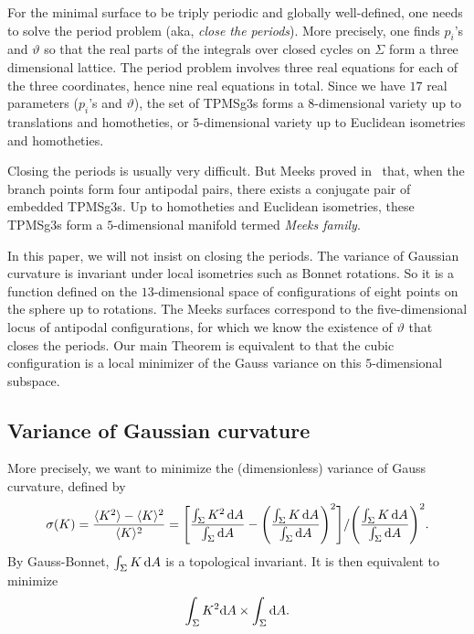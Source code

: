 \documentclass[a4paper]{amsart}
\newcommand{\dd}{{\rm d}}
\theoremstyle{plain} %
\theoremstyle{definition} %
\theoremstyle{remark}
\begin{document}
For the minimal surface to be triply periodic and globally well-defined, one
needs to solve the period problem (aka, \emph{close the periods}).  More
precisely, one finds $p_i$'s and $\vartheta$ so that the real parts of the
integrals over closed cycles on $\Sigma$ form a three dimensional lattice.  The
period problem involves three real equations for each of the three coordinates,
hence nine real equations in total.  Since we have $17$ real parameters
($p_i$'s and $\vartheta$), the set of TPMSg3s forms a $8$-dimensional variety up
to translations and homotheties, or $5$-dimensional variety up to Euclidean isometries and homotheties.

Closing the periods is usually very difficult.  But Meeks proved
in~\cite{meeks1990} that, when the branch points form four antipodal pairs,
there exists a conjugate pair of embedded TPMSg3s.  Up to homotheties and
Euclidean isometries, these TPMSg3s form a $5$-dimensional manifold termed
\emph{Meeks family}.

In this paper, we will not insist on closing the periods.  The variance of
Gaussian curvature is invariant under local isometries such as Bonnet rotations.
So it is a function defined on the $13$-dimensional space of configurations of
eight points on the sphere up to rotations.  The Meeks surfaces correspond to
the five-dimensional locus of antipodal configurations, for which we know the
existence of $\vartheta$ that closes the periods.  Our main Theorem is
equivalent to that the cubic configuration is a local minimizer of the Gauss
variance on this $5$-dimensional subspace.

\subsection{Variance of Gaussian curvature}

More precisely, we want to minimize the (dimensionless) variance of Gauss
curvature, defined by
\[
	\sigma(K)
	= \frac{\langle K^2 \rangle - \langle K \rangle^2}{\langle K \rangle^2}
	= \Bigg[\frac{\int_\Sigma K^2 \, \dd A}{\int_\Sigma \dd A} - \Bigg( \frac{\int_\Sigma K \, \dd A}{\int_\Sigma \dd A} \Bigg)^2\Bigg] / \Bigg( \frac{\int_\Sigma K \, \dd A}{\int_\Sigma \dd A} \Bigg)^2.
\]
By Gauss-Bonnet, $\int_\Sigma K \, \dd A$ is a topological invariant.  It is then
equivalent to minimize
\begin{equation}\label{eq:form1}
	\int_\Sigma K^2 \dd A \times \int_\Sigma \dd A.
\end{equation}
\end{document}
